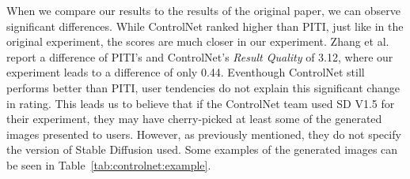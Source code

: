 When we compare our results to the results of the original paper, we can observe significant differences. While ControlNet ranked higher than PITI, just like in the original experiment, the scores are much closer in our experiment. Zhang et al. report a difference of PITI's and ControlNet's \textit{Result Quality} of 3.12, where our experiment leads to a difference of only 0.44. Eventhough ControlNet still performs better than PITI, user tendencies do not explain this significant change in rating. This leads us to believe that if the ControlNet team used SD V1.5 for their experiment, they may have cherry-picked at least some of the generated images presented to users. However, as previously mentioned, they do not specify the version of Stable Diffusion used. Some examples of the generated images can be seen in Table~\ref{tab:controlnet:example}.
\begin{table}[hbp]
    \centering
\end{table}

